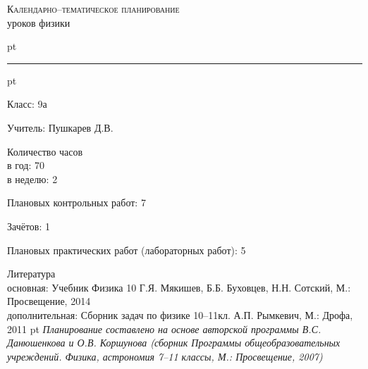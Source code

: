 \documentclass[12pt,a4paper]{article}
\newlength\tempindent
\renewcommand{\indent}{\hspace*{\tempindent}}
\begin{document}
\begin{center}
\textsc{Календарно--тематическое планирование}\\
уроков физики 
\end{center}
 pt
\hrule
{} pt

Класс: 9а

Учитель: Пушкарев Д.В.

Количество часов\\
\indent в год: 70\\
\indent в неделю: 2
  
Плановых контрольных работ: 7

Зачётов: 1

Плановых практических работ (лабораторных работ): 5

Литература\\
\indent основная:
Учебник Физика 10  Г.Я. Мякишев, Б.Б. Буховцев, Н.Н. Сотский, М.: Просвещение, 2014\\
\indent дополнительная: Сборник задач по физике 10--11кл. А.П. Рымкевич, М.: Дрофа, 2011
 pt
\textit{Планирование составлено на основе авторской программы В.С. Данюшенкова и О.В. Коршунова (сборник Программы общеобразовательных учреждений. Физика, астрономия 7--11 классы, М.: Просвещение, 2007)}
\end{document}
